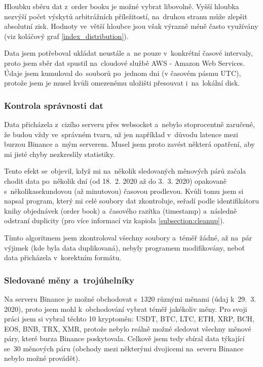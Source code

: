\documentclass[thesis=B,czech]{FITthesis}[2019/03/21]
\begin{document}
Hloubku sběru dat z~order booku je možné vybrat libovolně. Vyšší hloubka nezvýší počet výskytů arbitrážních příležitostí, na~druhou stranu může zlepšit absolutní zisk. Hodnoty ve~větší hloubce jsou však výrazně méně často využívány (viz koláčový graf \ref{index_distribution}).

Data jsem potřeboval ukládat neustále a~ne pouze v~konkrétní časové intervaly, proto jsem sběr dat spustil na~cloudové službě AWS - Amazon Web Services. Údaje jsem kumuloval do~souborů po~jednom dni (v časovém pásmu UTC), protože jsem je musel kvůli omezenému uložišti přesouvat i~na~lokální disk.

\subsubsection{Kontrola správnosti dat}
\label{section:kontrola_spravnosti_dat}
Data přicházela z~cizího serveru přes websocket a~nebylo stoprocentně zaručené, že budou vždy ve~správném tvaru, už jen například v~důvodu latence mezi burzou Binance a~mým serverem. Musel jsem proto zavést některá opatření, aby mi jisté chyby nezkreslily statistiky.

Tento efekt se~objevil, když mi na~několik sledovaných měnových párů začala chodit data po~několik dní (od 18.~2. 2020 až do 3.~3. 2020) opakovaně s~několikasekundovou (až minutovou) časovou prodlevou. Kvůli tomu jsem si napsal program, který mi celé soubory dat zkontroluje, seřadí podle identifikátoru knihy objednávek (order book) a~časového razítka (timestamp) a~následně odstraní duplicity (pro více informací viz kapiola \ref{subsection:cleanup}). 

Tímto algoritmem jsem zkontroloval všechny soubory a~téměř žádné, až na~pár výjimek (kde byla data duplikovaná), nebyly programem modifikovány, neboť data přicházela v~korektním formátu.

\subsubsection{Sledované měny a~trojúhelníky}
Na serveru Binance je možné obchodovat s~1320 různými měnami (údaj k~29.~3. 2020), proto jsem mohl k~obchodování vybrat téměř jakékoliv měny. Pro svoji práci jsem si vybral těchto 10 kryptoměn: USDT, BTC, LTC, ETH, XRP, BCH, EOS, BNB, TRX, XMR, protože nebylo reálně možné sledovat všechny měnové páry, které burza Binance poskytovala. Celkově jsem tedy sbíral data týkající se~30 měnových páru (obchody mezi některými dvojicemi na~severu Binance nebylo možné provádět).
\end{document}

